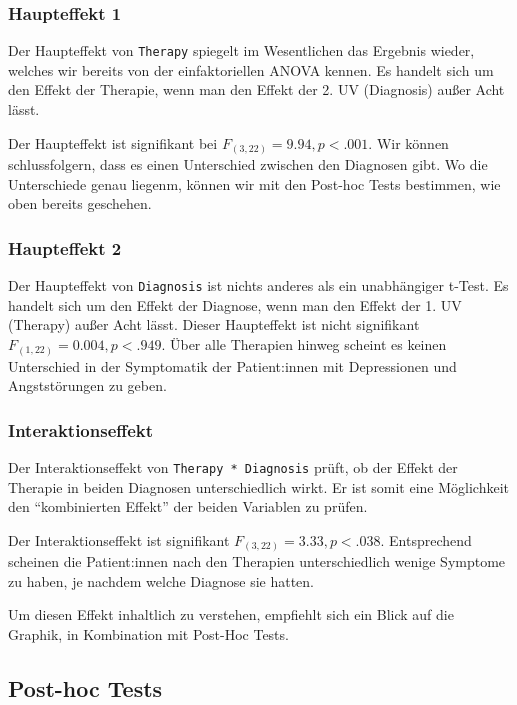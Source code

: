 \documentclass[
]{book}
\begin{document}
\subsubsection{Haupteffekt 1}\label{haupteffekt-1}

Der Haupteffekt von \texttt{Therapy} spiegelt im Wesentlichen das Ergebnis wieder, welches wir bereits von der einfaktoriellen ANOVA kennen. Es handelt sich um den Effekt der Therapie, wenn man den Effekt der 2. UV (Diagnosis) außer Acht lässt.

Der Haupteffekt ist signifikant bei \(F_{(3,22)}=9.94, p<.001\). Wir können schlussfolgern, dass es einen Unterschied zwischen den Diagnosen gibt. Wo die Unterschiede genau liegenm, können wir mit den Post-hoc Tests bestimmen, wie oben bereits geschehen.

\subsubsection{Haupteffekt 2}\label{haupteffekt-2}

Der Haupteffekt von \texttt{Diagnosis} ist nichts anderes als ein unabhängiger t-Test. Es handelt sich um den Effekt der Diagnose, wenn man den Effekt der 1. UV (Therapy) außer Acht lässt. Dieser Haupteffekt ist nicht signifikant \(F_{(1,22)}=0.004, p<.949\). Über alle Therapien hinweg scheint es keinen Unterschied in der Symptomatik der Patient:innen mit Depressionen und Angststörungen zu geben.

\subsubsection{Interaktionseffekt}\label{interaktionseffekt}

Der Interaktionseffekt von \texttt{Therapy\ *\ Diagnosis} prüft, ob der Effekt der Therapie in beiden Diagnosen unterschiedlich wirkt.
Er ist somit eine Möglichkeit den ``kombinierten Effekt'' der beiden Variablen zu prüfen.

Der Interaktionseffekt ist signifikant \(F_{(3,22)}=3.33, p<.038\). Entsprechend scheinen die Patient:innen nach den Therapien unterschiedlich wenige Symptome zu haben, je nachdem welche Diagnose sie hatten.

Um diesen Effekt inhaltlich zu verstehen, empfiehlt sich ein Blick auf die Graphik, in Kombination mit Post-Hoc Tests.

\subsection{Post-hoc Tests}\label{post-hoc-tests-1}
\end{document}
